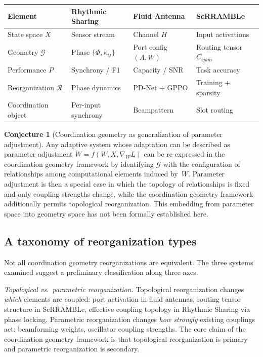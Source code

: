 \documentclass[11pt, a4paper]{article}
\theoremstyle{definition}
\newtheorem{conjecture}{Conjecture}
\theoremstyle{remark}
\begin{document}
\bigskip
\noindent
\begin{tabular}{@{}p{}p{}p{}p{}@{}}
\toprule
\textbf{Element} & \textbf{Rhythmic Sharing} & \textbf{Fluid Antenna}
  & \textbf{ScRRAMBLe} \\
\midrule
State space $X$ & Sensor stream & Channel $H$ & Input activations \\
Geometry $\mathcal{G}$ & Phase $\{\Phi,\kappa_{ij}\}$ & Port config $(A,W)$
  & Routing tensor $C_{ijkm}$ \\
Performance $P$ & Synchrony / F1 & Capacity / SNR & Task accuracy \\
Reorganization $\mathcal{R}$ & Phase dynamics & PD-Net + GPPO
  & Training + sparsity \\
Coordination object & Per-input synchrony & Beampattern & Slot routing \\
\bottomrule
\end{tabular}
\bigskip

\begin{conjecture}[Coordination geometry as generalization of parameter adjustment]
\label{conj:generalization}
Any adaptive system whose adaptation can be described as parameter adjustment
$\dot{W} = f(W, X, \nabla_W L)$ can be re-expressed in the coordination
geometry framework by identifying $\mathcal{G}$ with the configuration of
relationships among computational elements induced by~$W$. Parameter
adjustment is then a special case in which the topology of relationships is
fixed and only coupling strengths change, while the coordination geometry
framework additionally permits topological reorganization. This embedding
from parameter space into geometry space has not been formally established
here.
\end{conjecture}

\subsection*{A taxonomy of reorganization types}

Not all coordination geometry reorganizations are equivalent. The three
systems examined suggest a preliminary classification along three axes.

\textit{Topological vs.\ parametric reorganization.} Topological
reorganization changes \emph{which} elements are coupled: port activation
in fluid antennas, routing tensor structure in ScRRAMBLe, effective coupling
topology in Rhythmic Sharing via phase locking. Parametric reorganization
changes \emph{how strongly} existing couplings act: beamforming weights,
oscillator coupling strengths. The core claim of the coordination geometry
framework is that topological reorganization is primary and parametric
reorganization is secondary.
\end{document}
